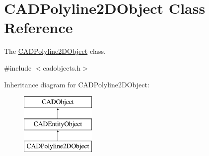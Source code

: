 \hypertarget{class_c_a_d_polyline2_d_object}{}\section{C\+A\+D\+Polyline2\+D\+Object Class Reference}
\label{class_c_a_d_polyline2_d_object}


The \hyperlink{class_c_a_d_polyline2_d_object}{C\+A\+D\+Polyline2\+D\+Object} class.  




{\ttfamily \#include $<$cadobjects.\+h$>$}

Inheritance diagram for C\+A\+D\+Polyline2\+D\+Object\+:\begin{figure}[H]
\begin{center}
\leavevmode
\includegraphics[height=3.000000cm]{class_c_a_d_polyline2_d_object}
\end{center}
\end{figure}
